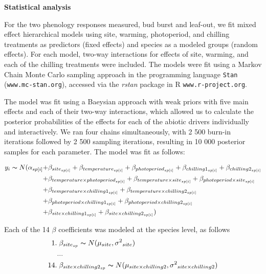 \documentclass[11pt]{article}
\begin{document}
\textbf{Statistical analysis}

For the two phenology responses measured, bud burst and leaf-out, we fit mixed effect hierarchical models using site, warming, photoperiod, and chilling treatments as predictors (fixed effects) and species as a modeled groups (random effects). For each model, two-way interactions for effects of site, warming, and each of the chilling treatments were included. The models were fit using a Markov Chain Monte Carlo sampling approach in the programming language \texttt{Stan} \cite{Carpenter:2016aa}(\texttt{www.mc-stan.org}), accessed via the \textit{rstan} package in R \texttt{www.r-project.org}.

The model was fit using a Baeysian approach with weak priors with five main effects and each of their two-way interactions, which allowed us to calculate the posterior probabilities of the effects for each of the abiotic drivers individually and interactively. We ran four chains simultaneously, with 2 500 burn-in iterations followed by 2 500 sampling iterations, resulting in 10 000 posterior samples for each parameter. The model was fit as follows:

\begin{align*}
y_i \thicksim N(\alpha_{sp[i]} +& \beta_{site_{sp[i]}} + \beta_{temperature_{sp[i]}} + \beta_{photoperiod_{sp[i]}} + \beta_{chilling1_{sp[i]}} + \beta_{chilling2_{sp[i]}}  \\
	+& \beta_{temperature \times photoperiod_{sp[i]}} + \beta_{temperature \times site_{sp[i]}} + \beta_{photoperiod \times site_{sp[i]}} \\
	+& \beta_{temperature \times chilling1_{sp[i]}} + \beta_{temperature \times chilling2_{sp[i]}} \\
	+& \beta_{photoperiod \times chilling1_{sp[i]}} + \beta_{photoperiod \times chilling2_{sp[i]}} \\
	+& \beta_{site \times chilling1_{sp[i]}}  + \beta_{site \times chilling2_{sp[i]}} )
\end{align*}

Each of the 14 $\beta$ coefficients was modeled at the species level, as follows
\begin{align*}
1.& \; \beta_{site_{sp}} \thicksim N(\mu_{site}, \sigma{^2}_{site}) \\
   &... \\
14.& \; \beta_{site \times chilling2_{sp}} \thicksim N(\mu_{site \times chilling2}, \sigma{^2}_{site \times chilling2})
\end{align*}
\end{document}
